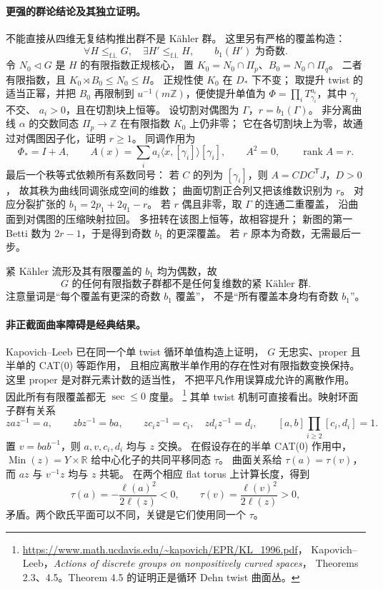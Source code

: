 \documentclass[UTF8,fontset=fandol,zihao=-4,oneside,openany]{ctexbook}
\theoremstyle{cjkplain}
\numberwithin{equation}{chapter}
\begin{document}
\paragraph{更强的群论结论及其独立证明。}
不能直接从四维无复结构推出群不是 K\"ahler 群。
这里另有严格的覆盖构造：
\begin{equation}
 \forall H\le_{\mathrm{f.i.}}G,\quad
 \exists H'\le_{\mathrm{f.i.}}H,\qquad b_1(H')\text{ 为奇数}.
 \label{BUNTOP:odd-deeper-cover}
\end{equation}
令 \(N_0\triangleleft G\) 是 \(H\) 的有限指数正规核心，
置 \(K_0=N_0\cap\Pi_p\)、\(B_0=N_0\cap\Pi_q\)。
二者有限指数，且
\(K_0\rtimes B_0\le N_0\le H\)。
正规性使 \(K_0\) 在 \(D_*\) 下不变；
取提升 twist 的适当正幂，并把 \(B_0\) 再限制到
\(u^{-1}(m\mathbb Z)\)，便使提升单值为
\(\Phi=\prod_iT_{\gamma_i}^{a_i}\)，其中 \(\gamma_i\) 不交、
\(a_i>0\)，且在切割块上恒等。
设切割对偶图为 \(\Gamma\)，\(r=b_1(\Gamma)\)。
非分离曲线 \(\alpha\) 的交数同态 \(\Pi_p\to\mathbb Z\)
在有限指数 \(K_0\) 上仍非零；
它在各切割块上为零，故通过对偶图因子化，证明 \(r\ge1\)。
同调作用为
\[
 \Phi_*=I+A,\qquad
 A(x)=\sum_i a_i\langle x,[\gamma_i]\rangle[\gamma_i],
 \qquad A^2=0,\qquad\operatorname{rank}A=r.
\]
最后一个秩等式依赖所有系数同号：
若 \(C\) 的列为 \([\gamma_i]\)，则
\(A=CDC^{\mathsf T}J\)，\(D>0\)，
故其秩为曲线同调张成空间的维数；
曲面切割正合列又把该维数识别为 \(r\)。
对应分裂扩张的
\(b_1=2p_1+2q_1-r\)。
若 \(r\) 偶且非零，取 \(\Gamma\) 的连通二重覆盖，
沿曲面到对偶图的压缩映射拉回。
多扭转在该图上恒等，故相容提升；
新图的第一 Betti 数为 \(2r-1\)，于是得到奇数 \(b_1\) 的更深覆盖。
若 \(r\) 原本为奇数，无需最后一步。

紧 K\"ahler 流形及其有限覆盖的 \(b_1\) 均为偶数，故
\begin{equation}
 G\text{ 的任何有限指数子群都不是任何复维数的紧 K\"ahler 群}.
 \label{BUNTOP:not-virtually-kahler}
\end{equation}
注意量词是“每个覆盖有更深的奇数 \(b_1\) 覆盖”，
不是“所有覆盖本身均有奇数 \(b_1\)”。

\paragraph{非正截面曲率障碍是经典结果。}
Kapovich--Leeb 已在同一个单 twist 循环单值构造上证明，
\(G\) 无忠实、proper 且半单的 CAT(0) 等距作用，
且相应离散半单作用的存在性对有限指数变换保持。
这里 proper 是对群元素计数的适当性，
不把平凡作用误算成允许的离散作用。
因此所有有限覆盖都无 \(\sec\le0\) 度量。%
\footnote{\url{https://www.math.ucdavis.edu/~kapovich/EPR/KL_1996.pdf}，
Kapovich--Leeb，\emph{Actions of discrete groups on nonpositively curved spaces}，
Theorems 2.3、4.5。Theorem 4.5 的证明正是循环 Dehn twist 曲面丛。}
其单 twist 机制可直接看出。映射环面子群有关系
\[
 zaz^{-1}=a,\qquad zbz^{-1}=ba,\qquad
 zc_iz^{-1}=c_i,\quad zd_iz^{-1}=d_i,\qquad
 [a,b]\prod_{i\ge2}[c_i,d_i]=1.
\]
置 \(v=bab^{-1}\)，则 \(a,v,c_i,d_i\) 均与 \(z\) 交换。
在假设存在的半单 CAT(0) 作用中，
\(\operatorname{Min}(z)=Y\times\mathbb R\)
给中心化子的共同平移同态 \(\tau\)。
曲面关系给 \(\tau(a)=\tau(v)\)，
而 \(az\) 与 \(v^{-1}z\) 均与 \(z\) 共轭。
在两个相应 flat torus 上计算长度，得到
\[
 \tau(a)=-\frac{\ell(a)^2}{2\ell(z)}<0,\qquad
 \tau(v)=\frac{\ell(v)^2}{2\ell(z)}>0,
\]
矛盾。两个欧氏平面可以不同，关键是它们使用同一个 \(\tau\)。
\end{document}
